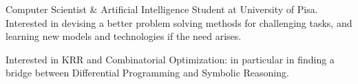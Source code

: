 

\begin{cvparagraph}

Computer Scientist \& Artificial Intelligence Student at University of Pisa. Interested in devising a better problem solving methods for challenging tasks, and learning new models and technologies if the need arises.

Interested in KRR and Combinatorial Optimization: in particular in finding a bridge between Differential Programming and Symbolic Reasoning.

\end{cvparagraph}
